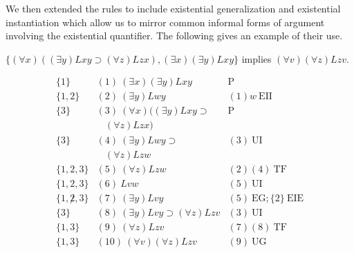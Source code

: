 
We then extended the rules to include existential generalization and existential instantiation which allow us to mirror common informal forms of argument involving the existential quantifier. The following gives an example of their use.
\begin{center}
$\{(\forall x) ((\exists y) Lxy \supset (\forall z) Lzx), (\exists x)(\exists
y) Lxy \}$ implies $(\forall v)(\forall z) Lzv.$
\end{center}
\[
\begin{array}{lll}
\{1\}   & (1)\  (\exists x)(\exists y) Lxy &  \mathrm{P}\\
\{1,2\}   & (2)\ (\exists y) Lwy  & (1)w\ \mathrm{EII}\\
\{3\}   & (3)\ (\forall x) ((\exists y) Lxy \supset   & 
\mathrm{P}\\
  &\ \ \ \  (\forall z) Lzx)  & \\
\{3\}   & (4)\ (\exists y) Lwy \supset   & (3)\ \mathrm{UI}\\
  &\ \ \ \ (\forall z) Lzw & \\
\{1,2,3\}   & (5)\ (\forall z) Lzw  & (2)(4)\ \mathrm{TF}\\
\{1,2,3\}   & (6)\ Lvw  & (5)\ \mathrm{UI}\\
\{1,\not 2,3\}   & (7)\ (\exists y) Lvy  & (5)\ \mathrm{EG};\{2\}\
\mathrm{EIE}\\ 
\{3\}   & (8)\ (\exists y) Lvy \supset (\forall z) Lzv  & (3)\ \mathrm{UI}\\
\{1,3\}   & (9)\  (\forall z) Lzv & (7)(8)\ \mathrm{TF}\\
\{1,3\}   & (10)\  (\forall v)(\forall z) Lzv & (9)\ \mathrm{UG}
\end{array}
\]

